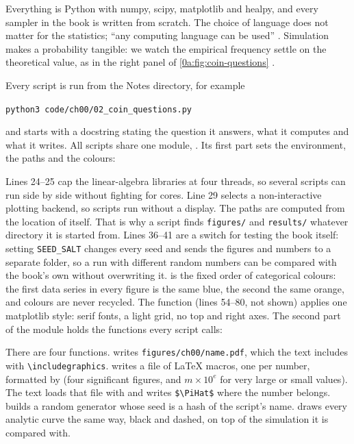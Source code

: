 Everything is Python with numpy, scipy, matplotlib and healpy, and every
sampler in the book is written from scratch. The choice of language does not
matter for the statistics; ``any computing language can be used''
. Simulation makes a probability tangible: we watch the
empirical frequency settle on the theoretical value, as in the right panel of
\cref{0a:fig:coin-questions} .

Every script is run from the Notes directory, for example
\begin{center}
\texttt{python3 code/ch00/02\_coin\_questions.py}
\end{center}
and starts with a docstring stating the question it answers, what it computes
and what it writes. All scripts share one module, .
Its first part sets the environment, the paths and the colours:


Lines 24--25 cap the linear-algebra libraries at four threads, so several
scripts can run side by side without fighting for cores. Line 29 selects a
non-interactive plotting backend, so scripts run without a display. The paths
are computed from the location of  itself. That is why a
script finds \texttt{figures/} and \texttt{results/} whatever directory it is
started from. Lines 36--41 are a switch for testing the book itself: setting
\texttt{SEED\_SALT} changes every seed and sends the figures and numbers to a
separate folder, so a run with different random numbers can be compared with
the book's own without overwriting it.  is the fixed order of categorical colours: the
first data series in every figure is the same blue, the second the same
orange, and colours are never recycled. The function  (lines
54--80, not shown) applies one matplotlib style: serif fonts, a light grid, no
top and right axes. The second part of the module holds the functions every
script calls:


There are four functions.  writes
\texttt{figures/ch00/name.pdf}, which the text includes with
\verb|\includegraphics|.  writes a file of \LaTeX{}
macros, one per number, formatted by  (four significant figures,
and $m\times10^{e}$ for very large or small values). The text loads that file
with \verb|| and writes \verb|$\PiHat$| where the number belongs.
 builds a random generator whose seed is a hash of the
script's name.  draws every analytic curve the same way,
black and dashed, on top of the simulation it is compared with.

